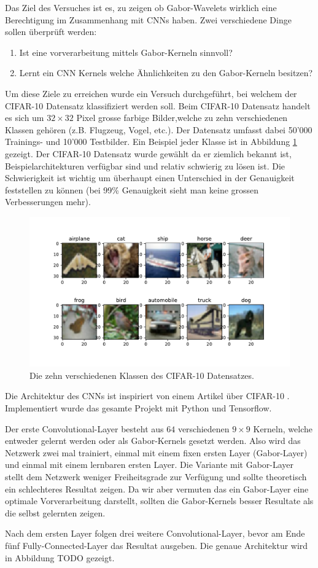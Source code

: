 Das Ziel des Versuches ist es, zu zeigen ob Gabor-Wavelets wirklich eine Berechtigung im Zusammenhang mit CNNs haben.
Zwei verschiedene Dinge sollen überprüft werden:
\begin{enumerate}
	\item Ist eine vorverarbeitung mittels Gabor-Kerneln sinnvoll?
	\item Lernt ein CNN Kernels welche Ähnlichkeiten zu den Gabor-Kerneln besitzen?
\end{enumerate}
Um diese Ziele zu erreichen wurde ein Versuch durchgeführt, bei welchem der CIFAR-10 \cite{paper:cifar10} Datensatz klassifiziert werden soll.
Beim CIFAR-10 Datensatz handelt es sich um $32 \times 32$ Pixel grosse farbige Bilder,welche zu zehn verschiedenen Klassen gehören (z.B. Flugzeug, Vogel, etc.).
Der Datensatz umfasst dabei 50'000 Trainings- und 10'000 Testbilder.
Ein Beispiel jeder Klasse ist in Abbildung \ref{fig:cifar10} gezeigt.
Der CIFAR-10 Datensatz wurde gewählt da er ziemlich bekannt ist, Beispielarchitekturen verfügbar sind und relativ schwierig zu lösen ist.
Die Schwierigkeit ist wichtig um überhaupt einen Unterschied in der Genauigkeit feststellen zu können (bei 99\% Genauigkeit sieht man keine grossen Verbesserungen mehr).

\begin{figure}
	\centering
	\includegraphics[width=0.6\linewidth, trim=0 60 0 40, clip]{./papers/visuell/images/cifar10}
	\caption{Die zehn verschiedenen Klassen des CIFAR-10 Datensatzes.}
	\label{fig:cifar10}
\end{figure}

Die Architektur des CNNs ist inspiriert von einem Artikel über CIFAR-10 \cite{online:cifar10}.
Implementiert wurde das gesamte Projekt mit Python und Tensorflow.

Der erste Convolutional-Layer besteht aus $64$ verschiedenen $9 \times 9$ Kerneln, welche entweder gelernt werden oder als Gabor-Kernels gesetzt werden.
Also wird das Netzwerk zwei mal trainiert, einmal mit einem fixen ersten Layer (Gabor-Layer) und einmal mit einem lernbaren ersten Layer.
Die Variante mit Gabor-Layer stellt dem Netzwerk weniger Freiheitsgrade zur Verfügung und sollte theoretisch ein schlechteres Resultat zeigen.
Da wir aber vermuten das ein Gabor-Layer eine optimale Vorverarbeitung darstellt, sollten die Gabor-Kernels besser Resultate als die selbst gelernten zeigen.

Nach dem ersten Layer folgen drei weitere Convolutional-Layer, bevor am Ende fünf Fully-Connected-Layer das Resultat ausgeben.
Die genaue Architektur wird in Abbildung TODO gezeigt. %


